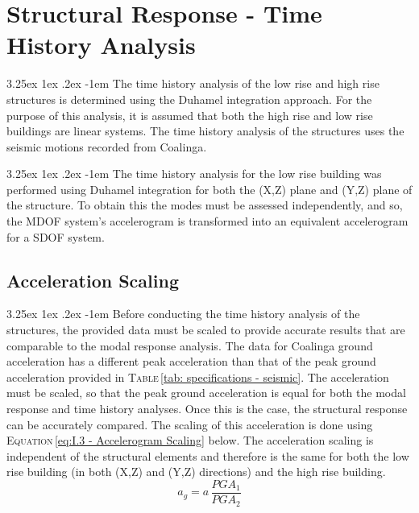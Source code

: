 \documentclass[11pt,a4paper,titlepage]{report}
\makeatletter
\renewcommand\paragraph{\@startsection{paragraph}{5}{\z@}%
  {3.25ex \@plus1ex \@minus.2ex}%
  {-1em}%
  {\normalfont\normalsize\bfseries}}
\makeatother
\begin{document}
\chapter{Structural Response - Time History Analysis}
\paragraph{}The time history analysis of the low rise and high rise structures is determined using the Duhamel integration approach. For the purpose of this analysis, it is assumed that both the high rise and low rise buildings are linear systems. The time history analysis of the structures uses the seismic motions recorded from Coalinga. 

\paragraph{}The time history analysis for the low rise building was performed using Duhamel integration for both the (X,Z) plane and (Y,Z) plane of the structure. To obtain this the modes must be assessed independently, and so, the MDOF system's accelerogram is transformed into an equivalent accelerogram for a SDOF system. 

\section{Acceleration Scaling}
\paragraph{}Before conducting the time history analysis of the structures, the provided data must be scaled to provide accurate results that are comparable to the modal response analysis. The data for Coalinga ground acceleration has a different peak acceleration than that of the peak ground acceleration provided in \textsc{Table}\,\ref{tab: specifications - seismic}. The acceleration must be scaled, so that the peak ground acceleration is equal for both the modal response and time history analyses. Once this is the case, the structural response can be accurately compared. The scaling of this acceleration is done using \textsc{Equation}\,\eqref{eq:I.3 - Accelerogram Scaling} below. The acceleration scaling is independent of the structural elements and therefore is the same for both the low rise building (in both (X,Z) and (Y,Z) directions) and the high rise building. 
\begin{equation}
    a_g = a\,\dfrac{PGA_1}{PGA_2}
   \label{eq:I.3 - Accelerogram Scaling}
\end{equation}
\end{document}
